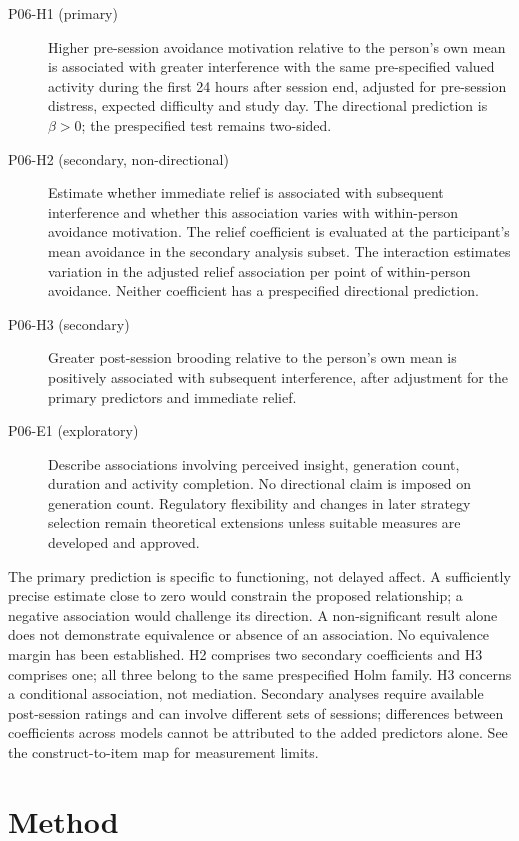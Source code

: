 \documentclass[11pt]{article}
\begin{document}
\begin{description}
\item[P06-H1 (primary)] Higher pre-session avoidance motivation relative to the person's own mean is associated with greater interference with the same pre-specified valued activity during the first 24 hours after session end, adjusted for pre-session distress, expected difficulty and study day. The directional prediction is $\beta>0$; the prespecified test remains two-sided.
\item[P06-H2 (secondary, non-directional)] Estimate whether immediate relief is associated with subsequent interference and whether this association varies with within-person avoidance motivation. The relief coefficient is evaluated at the participant's mean avoidance in the secondary analysis subset. The interaction estimates variation in the adjusted relief association per point of within-person avoidance. Neither coefficient has a prespecified directional prediction.
\item[P06-H3 (secondary)] Greater post-session brooding relative to the person's own mean is positively associated with subsequent interference, after adjustment for the primary predictors and immediate relief.
\item[P06-E1 (exploratory)] Describe associations involving perceived insight, generation count, duration and activity completion. No directional claim is imposed on generation count. Regulatory flexibility and changes in later strategy selection remain theoretical extensions unless suitable measures are developed and approved.
\end{description}
The primary prediction is specific to functioning, not delayed affect. A sufficiently precise estimate close to zero would constrain the proposed relationship; a negative association would challenge its direction. A non-significant result alone does not demonstrate equivalence or absence of an association. No equivalence margin has been established. H2 comprises two secondary coefficients and H3 comprises one; all three belong to the same prespecified Holm family. H3 concerns a conditional association, not mediation. Secondary analyses require available post-session ratings and can involve different sets of sessions; differences between coefficients across models cannot be attributed to the added predictors alone. See the construct-to-item map for measurement limits.

\section{Method}
\end{document}
